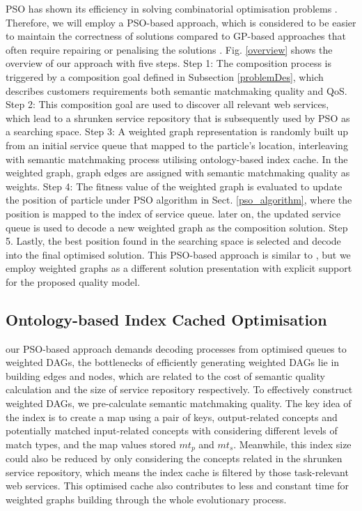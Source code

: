 \documentclass{llncs}
\begin{document}
PSO has shown its efficiency in solving combinatorial optimisation problems \cite{fukuyama2008fundamentals}. Therefore, we will employ a PSO-based approach, which is considered to be easier to maintain the correctness of solutions compared to GP-based approaches that often require repairing or penalising the solutions \cite{da2016particle}. Fig. \ref{overview} shows the overview of our approach with five steps. Step 1: The composition process is triggered by a composition goal defined in Subsection \ref{problemDes}, which describes customers requirements both semantic matchmaking quality and QoS. Step 2: This composition goal are used to discover all relevant web services, which lead to a shrunken service repository that is subsequently used by PSO as a searching space. Step 3: A weighted graph representation is randomly built up from an initial service queue that mapped to the particle's location, interleaving with semantic matchmaking process utilising ontology-based index cache. In the weighted graph, graph edges are assigned with semantic matchmaking quality as weights. Step 4: The fitness value of the weighted graph is evaluated to update the position of particle under PSO algorithm in Sect. \ref{pso_algorithm}, where the position is mapped to the index of service queue. later on, the updated service queue is used to decode a new weighted graph as the composition solution. Step 5. Lastly, the best position found in the searching space is selected and decode into the final optimised solution. This PSO-based approach is similar to \cite{da2016particle}, but we employ weighted graphs as a different solution presentation with explicit support for the proposed quality model.


\subsection{Ontology-based Index Cached Optimisation}\label{indexCache}
our PSO-based approach demands decoding processes from optimised queues to weighted DAGs, the bottlenecks of efficiently generating weighted DAGs lie in building edges and nodes, which are related to the cost of semantic quality calculation and the size of service repository respectively. To effectively construct weighted DAGs, we pre-calculate semantic matchmaking quality. The key idea of the index is to create a map using a pair of keys, output-related concepts and potentially matched input-related concepts with considering different levels of match types, and the map values stored $mt_{p}$ and $mt_{s}$. Meanwhile, this index size could also be reduced by only considering the concepts related in the shrunken service repository, which means the index cache is filtered by those task-relevant web services. This optimised cache also contributes to less and constant time for weighted graphs building through the whole evolutionary process.
\end{document}
